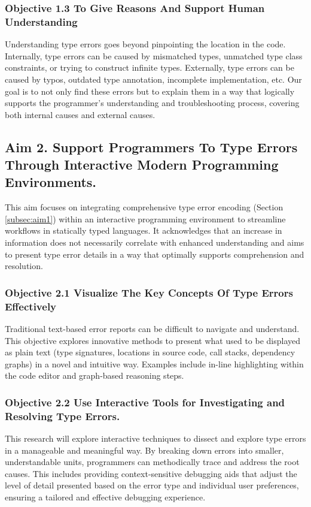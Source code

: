 \subsubsection{Objective 1.3 To Give Reasons And Support Human Understanding}
Understanding type errors goes beyond pinpointing the location in the code. Internally, type errors can be caused by mismatched types, unmatched type class constraints, or trying to construct infinite types. Externally, type errors can be caused by typos, outdated type annotation, incomplete implementation, etc. Our goal is to not only find these errors but to explain them in a way that logically supports the programmer's understanding and troubleshooting process, covering both internal causes and external causes.



\subsection{Aim 2. Support Programmers To Type Errors Through Interactive Modern Programming Environments.}

This aim focuses on integrating comprehensive type error encoding (Section \ref{subsec:aim1}) within an interactive programming environment to streamline workflows in statically typed languages. It acknowledges that an increase in information does not necessarily correlate with enhanced understanding and aims to present type error details in a way that optimally supports comprehension and resolution.

\subsubsection{Objective 2.1 Visualize The Key Concepts Of Type Errors Effectively}

Traditional text-based error reports can be difficult to navigate and understand. This objective explores innovative methods to present what used to be displayed as plain text (type signatures, locations in source code, call stacks, dependency graphs) in a novel and intuitive way. Examples include in-line highlighting within the code editor and graph-based reasoning steps.  

\subsubsection{Objective 2.2 Use Interactive Tools for Investigating and Resolving Type Errors.}

This research will explore interactive techniques to dissect and explore type errors in a manageable and meaningful way. By breaking down errors into smaller, understandable units, programmers can methodically trace and address the root causes. This includes providing context-sensitive debugging aids that adjust the level of detail presented based on the error type and individual user preferences, ensuring a tailored and effective debugging experience.


